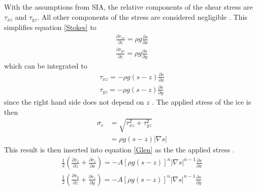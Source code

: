 \documentclass{article}
\begin{document}
With the assumptions from SIA, the relative components of the shear stress are $\tau_{xz}$ and $\tau_{yz}$. All other components of the stress are considered negligible \citep{Greve2009}. This simplifies equation \ref{Stokes} to 
\begin{subequations}\label{horSIA}
\begin{gather}
    \frac{\partial \tau_{xz}}{\partial z} = \rho g \frac{\partial s}{\partial x} \\
    \frac{\partial \tau_{yz}}{\partial z} = \rho g \frac{\partial s}{\partial y}
\end{gather}
\end{subequations}
which can be integrated to
\begin{subequations}\label{horSIAint}
\begin{gather}
    \tau_{xz} = -\rho g(s-z) \frac{\partial s}{\partial x} \\
    \tau_{yz} = -\rho g(s-z) \frac{\partial s}{\partial y}
\end{gather}
\end{subequations}
since the right hand side does not depend on $z$ \citep{Greve2009}. The applied stress of the ice is then
\begin{align}
    \sigma_e &= \sqrt{\tau^2_{xz}+\tau^2_{yz}} \nonumber\\
     &= \rho g(s-z) |\nabla s| 
\end{align}
This result is then inserted into equation \ref{Glen} as the the applied stress \citep{Greve2009}. 
\begin{subequations}

\begin{gather}
   \frac{1}{2} \left(\frac{\partial v_x}{\partial z}+\frac{\partial v_z}{\partial x}\right) = -A[\rho g (s-z)]^n|\nabla s |^{n-1}\frac{\partial s}{\partial x} \\
    \frac{1}{2} \left(\frac{\partial v_y}{\partial z}+\frac{\partial v_z}{\partial y}\right)  = -A[\rho g (s-z)]^n|\nabla s |^{n-1}\frac{\partial s}{\partial y} 
\end{gather}
\end{subequations}
\end{document}
